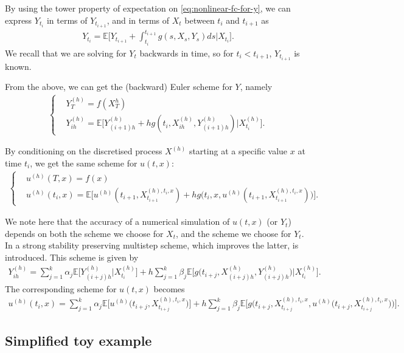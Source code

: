 \documentclass{article}  %
\begin{document}
By using the tower property of expectation on \autoref{eq:nonlinear-fc-for-y}, we can express $Y_{t_i}$ in terms of $Y_{t_{i+1}}$, and in terms of $X_t$ between $t_i$ and $t_{i+1}$ as
%
\begin{align} 
    Y_{t_i} = \mathbb{E}\bigg[ Y_{t_{i+1}} + \int_{t_{i}}^{t_{i+1}}g(s,X_s,Y_s)ds \Big\lvert X_{t_i} \bigg].
\end{align}
%
We recall that we are solving for $Y_t$ backwards in time, so for $t_i < t_{i+1}$, $Y_{t_{i+1}}$ is known.

From the above, we can get the (backward) Euler scheme for $Y$, namely
%
\begin{align} %
    \begin{cases}
    &Y_T^{(h)} = f(X_T^{h})\\
    &Y_{ih}^{(h)} = \mathbb{E}\bigg[ Y_{(i+1)h}^{(h)} + h g(t_i,X_{ih}^{(h)},Y_{(i+1)h}^{(h)}) \Big\lvert X_{t_i}^{(h)} \bigg].
    \end{cases}
\end{align}
%

By conditioning on the discretised process $X^{(h)}$ starting at a specific value $x$ at time $t_i$, we get the same scheme for $u(t,x)$:
%
\begin{align}
    \begin{cases}
    &u^{(h)}(T,x) = f(x)\\
    &u^{(h)}(t_i,x) = \mathbb{E}\bigg[ u^{(h)}(t_{i+1},X^{(h),t_i,x}_{t_{i+1}}) + h g\big( t_i,x,u^{(h)}(t_{i+1},X^{(h),t_i,x}_{t_{i+1}}) \big) \bigg]. 
    \end{cases}
\end{align} 
%

We note here that the accuracy of a numerical simulation of $u(t,x)$ (or $Y_t$) depends on both the scheme we choose for $X_t$, and the scheme we choose for $Y_t$. In \cite{fang2023strong} a strong stability preserving multistep scheme, which improves the latter, is introduced. This scheme is given by
%
\begin{align} %
    Y_{ih}^{(h)} = \sum_{j=1}^{k} \alpha_j \mathbb{E}\bigg[ Y_{(i+j)h}^{(h)} \Big\lvert X_{t_i}^{(h)} \bigg] + h \sum_{j=1}^{k} \beta_j \mathbb{E}\bigg[ g\big(t_{i+j},X_{(i+j)h}^{(h)},Y_{(i+j)h}^{(h)}\big) \Big\lvert X_{t_i}^{(h)} \bigg].
\end{align}
%
The corresponding scheme for $u(t,x)$ becomes
%
\begin{align} 
    u^{(h)}(t_i,x) = \sum_{j=1}^{k} \alpha_j \mathbb{E}\bigg[ u^{(h)}\Big(t_{i+j},X_{t_{i+j}}^{(h),t_i,x}\Big) \bigg] + h \sum_{j=1}^{k} \beta_j \mathbb{E}\bigg[ g\Big(t_{i+j},X_{t_{i+j}}^{(h),t_i,x},u^{(h)}\big(t_{i+j},X_{t_{i+j}}^{(h),t_i,x}\big)\Big) \bigg].
\end{align}
%

\subsection{Simplified toy example}

% 
% 
\nocite{*}
\printbibliography
%
\end{document}
